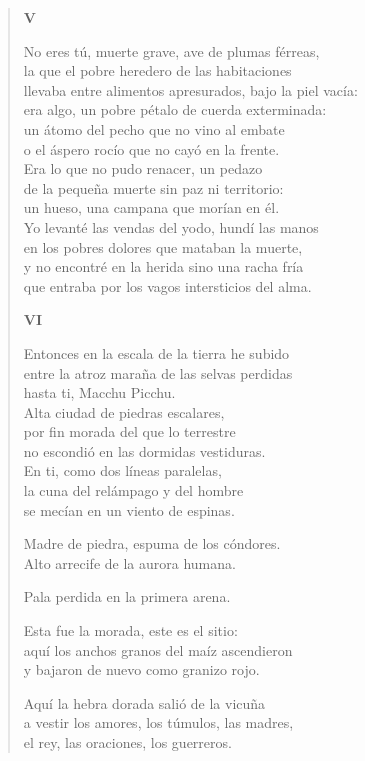\documentclass[12pt]{article}
\begin{document}
\begin{verse}
{\bfseries\scshape {V}}

No eres tú, muerte grave, ave de plumas férreas,\\
la que el pobre heredero de las habitaciones\\
llevaba entre alimentos apresurados, bajo la piel vacía:\\
era algo, un pobre pétalo de cuerda exterminada:\\
un átomo del pecho que no vino al embate\\
o el áspero rocío que no cayó en la frente.\\
Era lo que no pudo renacer, un pedazo\\
de la pequeña muerte sin paz ni territorio:\\
un hueso, una campana que morían en él.\\
Yo levanté las vendas del yodo, hundí las manos\\
en los pobres dolores que mataban la muerte,\\
y no encontré en la herida sino una racha fría\\
que entraba por los vagos intersticios del alma.  

{\bfseries\scshape {VI}}

Entonces en la escala de la tierra he subido\\
entre la atroz maraña de las selvas perdidas\\
hasta ti, Macchu Picchu.\\
Alta ciudad de piedras escalares,\\
por fin morada del que lo terrestre\\
no escondió en las dormidas vestiduras.\\
En ti, como dos líneas paralelas,\\
la cuna del relámpago y del hombre\\
se mecían en un viento de espinas.  

Madre de piedra, espuma de los cóndores.\\
Alto arrecife de la aurora humana.  

Pala perdida en la primera arena.  

Esta fue la morada, este es el sitio:\\
aquí los anchos granos del maíz ascendieron\\
y bajaron de nuevo como granizo rojo.  

Aquí la hebra dorada salió de la vicuña\\
a vestir los amores, los túmulos, las madres,\\
el rey, las oraciones, los guerreros.  


\end{verse}
\end{document}
